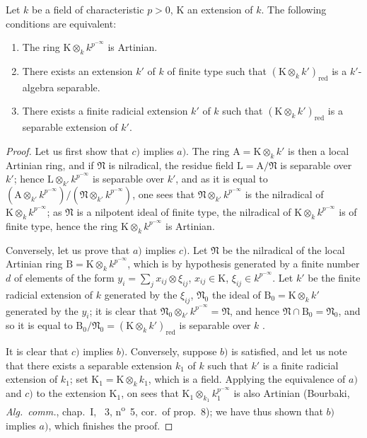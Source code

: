 \begin{lemma}[18.11.12.1]
\label{IV.18.11.12.1}
Let $k$ be a field of characteristic $p>0$, $\mathrm{K}$ an extension of $k$.
The following conditions are equivalent:
\begin{enumerate}[label=\alph*)]
  \item The ring $\mathrm{K}\otimes_kk^{p^{-\infty}}$ is Artinian.
  \item There exists an extension $k'$ of $k$ of finite type such that $(\mathrm{K}\otimes_kk')_{\mathrm{red}}$ is a $k'$-algebra separable.
  \item There exists a finite radicial extension $k'$ of $k$ such that $(\mathrm{K}\otimes_kk')_\mathrm{red}$ is a separable extension of $k'$.
\end{enumerate}
\end{lemma}

\begin{proof}
Let us first show that $c)$ implies $a)$.
The ring $\mathrm{A}=\mathrm{K}\otimes_kk'$ is then a local Artinian ring, and if $\mathfrak{N}$ is nilradical, the residue field $\mathrm{L}=\mathrm{A}/\mathfrak{N}$ is separable over $k'$; hence $\mathrm{L}\otimes_{k'}k^{p^{-\infty}}$ is separable over $k'$, and as it is equal to $(\mathrm{A}\otimes_{k'}k^{p^{-\infty}})/(\mathfrak{N}\otimes_{k'}k^{p^{-\infty}})$, one sees that $\mathfrak{N}\otimes_{k'}k^{p^{-\infty}}$ is the nilradical of $\mathrm{K}\otimes_kk^{p^{-\infty}}$; as $\mathfrak{N}$ is a nilpotent ideal of finite type, the nilradical of $\mathrm{K}\otimes_kk^{p^{-\infty}}$ is of finite type, hence the ring $\mathrm{K}\otimes_kk^{p^{-\infty}}$ is Artinian.

Conversely, let us prove that $a)$ implies $c)$.
Let $\mathfrak{N}$ be the nilradical of the local Artinian ring $\mathrm{B}=\mathrm{K}\otimes_kk^{p^{-\infty}}$, which is by hypothesis generated by a finite number $d$ of elements of the form $y_i=\sum_j x_{ij}\otimes\xi_{ij}$, $x_{ij}\in\mathrm{K}$, $\xi_{ij}\in k^{p^{-\infty}}$.
Let $k'$ be the finite radicial extension of $k$ generated by the $\xi_{ij}$, $\mathfrak{N}_0$ the ideal of $\mathrm{B}_0=\mathrm{K}\otimes_kk'$ generated by the $y_i$; it is clear that $\mathfrak{N}_0\otimes_{k'}k^{p^{-\infty}}=\mathfrak{N}$, and hence $\mathfrak{N}\cap\mathrm{B}_0=\mathfrak{N}_0$, and so it is equal to $\mathrm{B}_0/\mathfrak{N}_0=(\mathrm{K}\otimes_kk')_{\mathrm{red}}$ is separable over $k$ .

It is clear that $c)$ implies $b)$.
Conversely, suppose $b)$ is satisfied, and let us note that there exists a separable extension $k_1$ of $k$ such that $k'$ is a finite radicial extension of $k_1$; set $\mathrm{K}_1=\mathrm{K}\otimes_kk_1$, which is a field.
Applying the equivalence of $a)$ and $c)$ to the extension $\mathrm{K}_1$,
on sees that $\mathrm{K}_1\otimes_{k_1}k_1^{p^{-\infty}}$ is also Artinian (Bourbaki, \emph{Alg.\ comm.}, chap.~I, \textsection~3, n\textsuperscript{o}~5, cor.\ of prop.~8); we have thus shown that $b)$ implies $a)$, which finishes the proof.
\end{proof}


